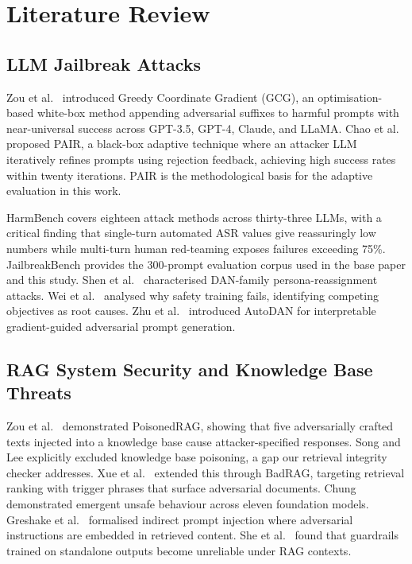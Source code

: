\documentclass[journal,10pt]{IEEEtran}
\begin{document}
\section{Literature Review}

\subsection{LLM Jailbreak Attacks}

Zou et al.\ \cite{zou2023universal} introduced Greedy Coordinate Gradient (GCG), an optimisation-based white-box method appending adversarial suffixes to harmful prompts with near-universal success across GPT-3.5, GPT-4, Claude, and LLaMA. Chao et al.\ \cite{chao2023jailbreaking} proposed PAIR, a black-box adaptive technique where an attacker LLM iteratively refines prompts using rejection feedback, achieving high success rates within twenty iterations. PAIR is the methodological basis for the adaptive evaluation in this work.

HarmBench \cite{mazeika2024harmbench} covers eighteen attack methods across thirty-three LLMs, with a critical finding that single-turn automated ASR values give reassuringly low numbers while multi-turn human red-teaming exposes failures exceeding 75\%. JailbreakBench \cite{chao2024jailbreakbench} provides the 300-prompt evaluation corpus used in the base paper and this study. Shen et al.\ \cite{shen2024anything} characterised DAN-family persona-reassignment attacks. Wei et al.\ \cite{wei2024jailbroken} analysed why safety training fails, identifying competing objectives as root causes. Zhu et al.\ \cite{zhu2024autodan} introduced AutoDAN for interpretable gradient-guided adversarial prompt generation.

\subsection{RAG System Security and Knowledge Base Threats}

Zou et al.\ \cite{zou2025poisonedrag} demonstrated PoisonedRAG, showing that five adversarially crafted texts injected into a knowledge base cause attacker-specified responses. Song and Lee \cite{song2026defending} explicitly excluded knowledge base poisoning, a gap our retrieval integrity checker addresses. Xue et al.\ \cite{xue2024badrag} extended this through BadRAG, targeting retrieval ranking with trigger phrases that surface adversarial documents. Chung \cite{chung2025empirical} demonstrated emergent unsafe behaviour across eleven foundation models. Greshake et al.\ \cite{greshake2023not} formalised indirect prompt injection where adversarial instructions are embedded in retrieved content. She et al.\ \cite{she2025rag} found that guardrails trained on standalone outputs become unreliable under RAG contexts.
\end{document}
